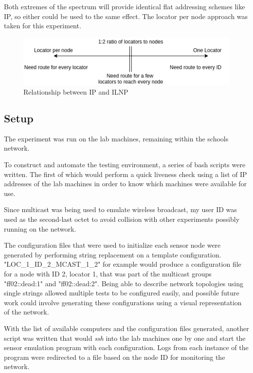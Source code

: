 \documentclass[12pt]{article}
\begin{document}
Both extremes of the spectrum will provide identical flat addressing schemes like IP, so either could be used to the same effect. The locator per node approach was taken for this experiment.

\begin{figure}[!ht]
	\centering
	\includegraphics[width=\linewidth]{images/spectrum}
	\caption{Relationship between IP and ILNP}
	\label{fig:spectrum}
\end{figure}

\subsection{Setup}

The experiment was run on the lab machines, remaining within the schools network. 

To construct and automate the testing environment, a series of bash scripts were written. The first of which would perform a quick liveness check using a list of IP addresses of the lab machines in order to know which machines were available for use.

Since multicast was being used to emulate wireless broadcast, my user ID was used as the second-last octet to avoid collision with other experiments possibly running on the network.

The configuration files that were used to initialize each sensor node were generated by performing string replacement on a template configuration. "LOC\_1\_ID\_2\_MCAST\_1\_2" for example would produce a configuration file for a node with ID 2, locator 1, that was part of the multicast groups "ff02::dead:1" and "ff02::dead:2". Being able to describe network topologies using single strings allowed multiple tests to be configured easily, and possible future work could involve generating these configurations using a visual representation of the network.

With the list of available computers and the configuration files generated, another script was written that would \emph{ssh} into the lab machines one by one and start the sensor emulation program with each configuration. Logs from each instance of the program were redirected to a file based on the node ID for monitoring the network.
\end{document}
